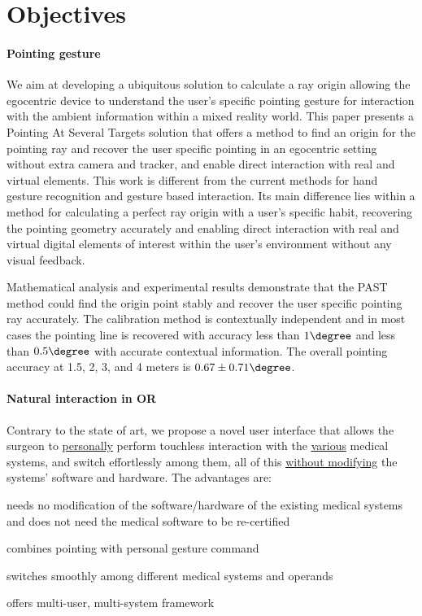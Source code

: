 \section{Objectives}

\paragraph{Pointing gesture} We aim at developing a ubiquitous solution to calculate a ray origin allowing the egocentric device to understand the user's specific pointing gesture for interaction with the ambient information within a mixed reality world.
This paper presents a Pointing At Several Targets solution that offers a method to find an origin for the pointing ray and recover the user specific pointing in an egocentric setting without extra camera and tracker, and enable direct interaction with real and virtual elements.
This work is different from the current methods for hand gesture recognition and gesture based interaction.  Its main difference lies within a method for calculating a perfect ray origin with a user's specific habit, recovering the pointing geometry accurately and enabling direct interaction with real and virtual digital elements of interest within the user's environment without any visual feedback.

Mathematical analysis and experimental results demonstrate that the PAST method could find the origin point stably and recover the user specific pointing ray accurately. The calibration method is contextually independent and in most cases the pointing line is recovered with accuracy less than $1\degree$ and less than $0.5\degree$ with accurate contextual information. The overall pointing accuracy at 1.5, 2, 3, and 4 meters is $0.67\pm0.71\degree$.

\paragraph{Natural interaction in OR}
Contrary to the state of art, we propose a novel user interface that allows the surgeon to \underline{personally} perform touchless interaction with the \underline{various} medical systems, and switch effortlessly among them, all of this \underline{without modifying} the systems' software and hardware. The advantages are: 
\begin{description} [font=$\bullet$\scshape\bfseries]
	\item needs no modification of the software/hardware of the existing medical systems and does not need the medical software to be re-certified
	\item combines pointing with personal gesture command
	\item switches smoothly among different medical systems and operands
	\item offers multi-user, multi-system framework
	\end{description}
	

